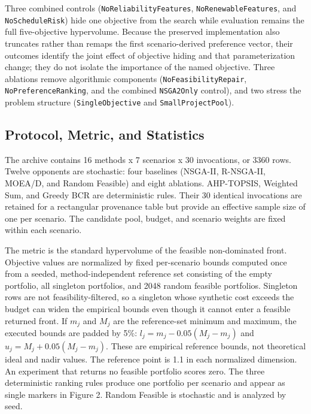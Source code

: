 \documentclass[energies,article,submit,moreauthors]{Definitions/mdpi}
\begin{document}
Three combined controls (\texttt{NoReliabilityFeatures}, \texttt{NoRenewableFeatures}, and \texttt{NoScheduleRisk}) hide one objective from the search while evaluation remains the full five-objective hypervolume. Because the preserved implementation also truncates rather than remaps the first scenario-derived preference vector, their outcomes identify the joint effect of objective hiding and that parameterization change; they do not isolate the importance of the named objective. Three ablations remove algorithmic components (\texttt{NoFeasibilityRepair}, \texttt{NoPreferenceRanking}, and the combined \texttt{NSGA2Only} control), and two stress the problem structure (\texttt{SingleObjective} and \texttt{SmallProjectPool}).

\subsection{Protocol, Metric, and Statistics}\label{protocol-metric-and-statistics}

The archive contains 16 methods x 7 scenarios x 30 invocations, or 3360 rows. Twelve opponents are stochastic: four baselines (NSGA-II, R-NSGA-II, MOEA/D, and Random Feasible) and eight ablations. AHP-TOPSIS, Weighted Sum, and Greedy BCR are deterministic rules. Their 30 identical invocations are retained for a rectangular provenance table but provide an effective sample size of one per scenario. The candidate pool, budget, and scenario weights are fixed within each scenario.

The metric is the standard hypervolume of the feasible non-dominated front. Objective values are normalized by fixed per-scenario bounds computed once from a seeded, method-independent reference set consisting of the empty portfolio, all singleton portfolios, and 2048 random feasible portfolios. Singleton rows are not feasibility-filtered, so a singleton whose synthetic cost exceeds the budget can widen the empirical bounds even though it cannot enter a feasible returned front. If \(m_j\) and \(M_j\) are the reference-set minimum and maximum, the executed bounds are padded by 5\%: \(l_j=m_j-0.05(M_j-m_j)\) and \(u_j=M_j+0.05(M_j-m_j)\). These are empirical reference bounds, not theoretical ideal and nadir values. The reference point is 1.1 in each normalized dimension. An experiment that returns no feasible portfolio scores zero. The three deterministic ranking rules produce one portfolio per scenario and appear as single markers in Figure 2. Random Feasible is stochastic and is analyzed by seed.
\end{document}
